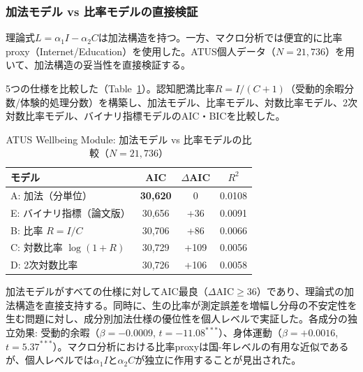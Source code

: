 \documentclass[a4paper,11pt,titlepage]{article}
\begin{document}
\subsubsection{加法モデル vs 比率モデルの直接検証}\label{sec:ratio-test}

理論式$L = \alpha_1 I - \alpha_2 C$は加法構造を持つ。一方、マクロ分析では便宜的に比率proxy（Internet/Education）を使用した。ATUS個人データ（$N = 21{,}736$）を用いて、加法構造の妥当性を直接検証する。

5つの仕様を比較した（Table~\ref{tab:model-comparison}）。認知肥満比率$R = I/(C+1)$（受動的余暇分数/体験的処理分数）を構築し、加法モデル、比率モデル、対数比率モデル、2次対数比率モデル、バイナリ指標モデルのAIC・BICを比較した。

\begin{table}[htbp]
\centering
\caption{ATUS Wellbeing Module: 加法モデル vs 比率モデルの比較（$N = 21{,}736$）}
\label{tab:model-comparison}
\begin{tabular}{lccc}
\hline
モデル & AIC & $\Delta$AIC & $R^2$ \\
\hline
A: 加法（分単位） & \textbf{30,620} & 0 & 0.0108 \\
E: バイナリ指標（論文版） & 30,656 & +36 & 0.0091 \\
B: 比率 $R = I/C$ & 30,706 & +86 & 0.0066 \\
C: 対数比率 $\log(1+R)$ & 30,729 & +109 & 0.0056 \\
D: 2次対数比率 & 30,726 & +106 & 0.0058 \\
\hline
\end{tabular}
\end{table}

加法モデルがすべての仕様に対してAIC最良（$\Delta\text{AIC} \geq 36$）であり、理論式の加法構造を直接支持する。同時に、生の比率が測定誤差を増幅し分母の不安定性を生む問題に対し、成分別加法仕様の優位性を個人レベルで実証した。各成分の独立効果: 受動的余暇（$\beta = -0.0009$, $t = -11.08^{***}$）、身体運動（$\beta = +0.0016$, $t = 5.37^{***}$）。マクロ分析における比率proxyは国-年レベルの有用な近似であるが、個人レベルでは$\alpha_1 I$と$\alpha_2 C$が独立に作用することが見出された。
\end{document}
